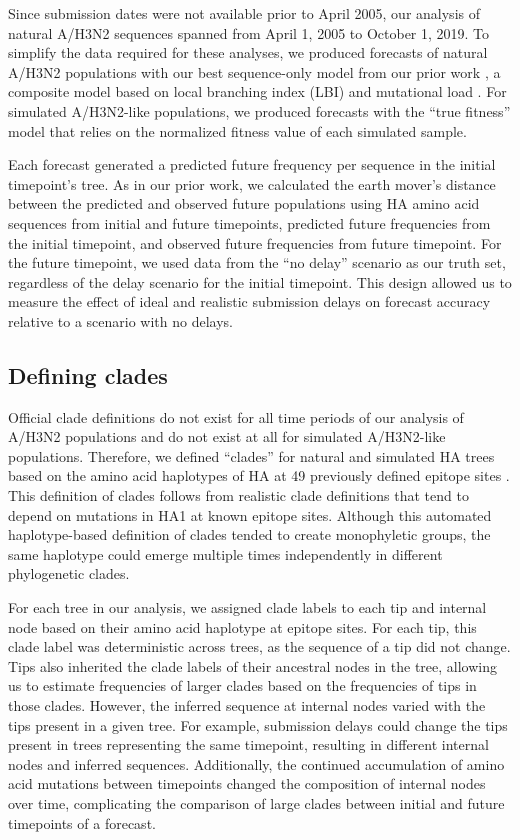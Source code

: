 \documentclass[9pt,lineno]{elife}
\begin{document}
Since submission dates were not available prior to April 2005, our analysis of natural A/H3N2 sequences spanned from April 1, 2005 to October 1, 2019.
To simplify the data required for these analyses, we produced forecasts of natural A/H3N2 populations with our best sequence-only model from our prior work \citep{Huddleston2020}, a composite model based on local branching index (LBI) \citep{Neher:2014eu} and mutational load \citep{Luksza:2014hj}.
For simulated A/H3N2-like populations, we produced forecasts with the ``true fitness'' model that relies on the normalized fitness value of each simulated sample.

Each forecast generated a predicted future frequency per sequence in the initial timepoint's tree.
As in our prior work, we calculated the earth mover's distance \citep{Rubner1998} between the predicted and observed future populations using HA amino acid sequences from initial and future timepoints, predicted future frequencies from the initial timepoint, and observed future frequencies from future timepoint.
For the future timepoint, we used data from the ``no delay'' scenario as our truth set, regardless of the delay scenario for the initial timepoint.
This design allowed us to measure the effect of ideal and realistic submission delays on forecast accuracy relative to a scenario with no delays.

\subsection{Defining clades}

Official clade definitions do not exist for all time periods of our analysis of A/H3N2 populations and do not exist at all for simulated A/H3N2-like populations.
Therefore, we defined ``clades'' for natural and simulated HA trees based on the amino acid haplotypes of HA at 49 previously defined epitope sites \citep{Luksza:2014hj}.
This definition of clades follows from realistic clade definitions that tend to depend on mutations in HA1 at known epitope sites.
Although this automated haplotype-based definition of clades tended to create monophyletic groups, the same haplotype could emerge multiple times independently in different phylogenetic clades.

For each tree in our analysis, we assigned clade labels to each tip and internal node based on their amino acid haplotype at epitope sites.
For each tip, this clade label was deterministic across trees, as the sequence of a tip did not change.
Tips also inherited the clade labels of their ancestral nodes in the tree, allowing us to estimate frequencies of larger clades based on the frequencies of tips in those clades.
However, the inferred sequence at internal nodes varied with the tips present in a given tree.
For example, submission delays could change the tips present in trees representing the same timepoint, resulting in different internal nodes and inferred sequences.
Additionally, the continued accumulation of amino acid mutations between timepoints changed the composition of internal nodes over time, complicating the comparison of large clades between initial and future timepoints of a forecast.
\end{document}
